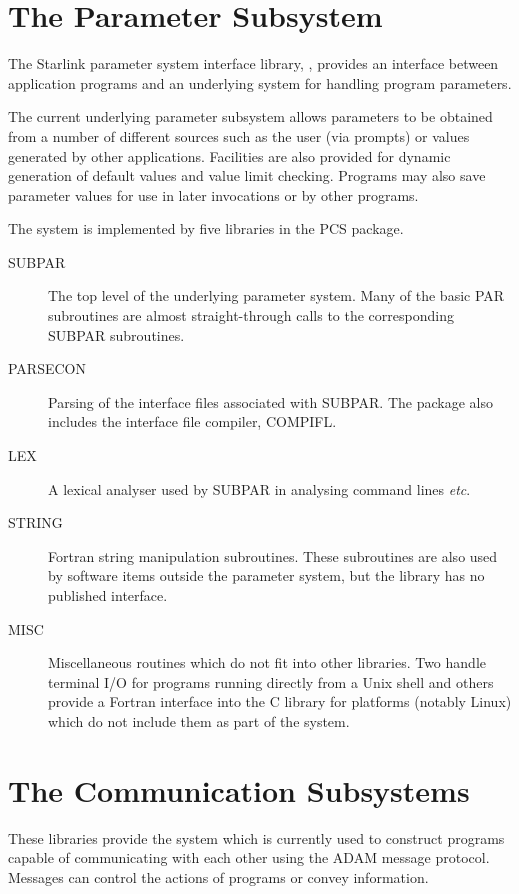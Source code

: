 \documentclass[twoside,11pt,nolof]{starlink}
\begin{document}
\scfrontmatter

\section{The Parameter Subsystem}
The Starlink parameter system interface library,
,
provides an interface between application programs and an underlying system
for handling program parameters.

The current underlying parameter subsystem allows parameters to be obtained
from a number of different sources such as the user (via prompts) or values
generated by other applications.
Facilities are also provided for dynamic generation of default values and
value limit checking.
Programs may also save parameter values for use in later invocations or by
other programs.

The system is implemented by five libraries in the PCS package.
\begin{description}
\item[SUBPAR] The top level of the underlying parameter system. Many
of the basic PAR subroutines are almost straight-through calls to the
corresponding SUBPAR subroutines.
\item[PARSECON] Parsing of the interface files associated with SUBPAR.
The package also includes the interface file compiler, COMPIFL.
\item[LEX] A lexical analyser used by SUBPAR in analysing command lines
\textit{etc}.
\item[STRING] Fortran string manipulation subroutines. These subroutines are
also used by software items outside the parameter system, but the library
has no published interface.
\item[MISC] Miscellaneous routines which do not fit into other libraries.
Two handle terminal I/O for programs running directly from a Unix shell
and others provide a Fortran interface into the C library for platforms
(notably Linux) which do not include them as part of the system.
\end{description}

\section{The Communication Subsystems}
These libraries provide the system which is currently used to construct
programs capable of communicating with each other using the ADAM message
protocol. Messages can control the actions of programs or convey information.
\end{document}
